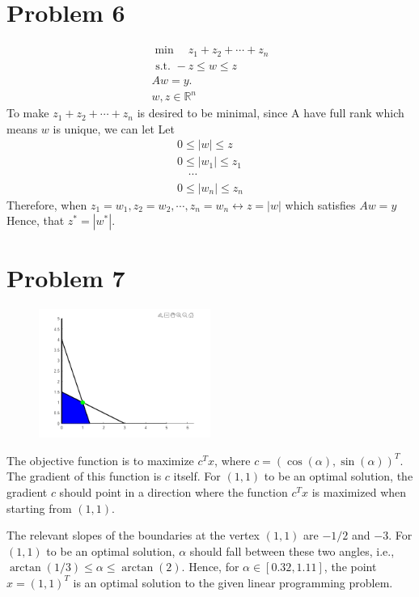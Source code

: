 \documentclass[12pt]{article}
\begin{document}
\section{Problem 6}
$$
\begin{gathered}
\min \quad z_1+z_2+\cdots+z_n \\
\text { s.t. }-z \leq w \leq z \\
A w=y . \\
w, z \in \mathbb{R}^n
\end{gathered}
$$
To make $z_1+z_2+\cdots+z_n$ is desired to be minimal, since A have full rank which means $w$ is unique, we can let 
Let
$$
\begin{gathered}
0 \leq|w| \leq z \\
0 \leq\left|w_1\right| \leq z_1 \\
\quad \cdots \\
0 \leq\left|w_n\right| \leq z_n
\end{gathered}
$$
Therefore, when $z_1=w_1, z_2=w_2, \cdots, z_n=w_n \leftrightarrow z=|w|$ which satisfies $A w=y$
Hence, that $z^*=\left|w^*\right|$.


\clearpage
\section{Problem 7}
\begin{figure}[h]
    \centering
    \includegraphics[width=0.5\textwidth]{fig2.png}
    \label{fig:fig2}
\end{figure}

The objective function is to maximize \(c^T x\), where \(c = (\cos(\alpha), \sin(\alpha))^T\). The gradient of this function is \(c\) itself. For \((1,1)\) to be an optimal solution, the gradient \(c\) should point in a direction where the function \(c^T x\) is maximized when starting from \((1,1)\).

The relevant slopes of the boundaries at the vertex \((1, 1)\) are \(-1/2\) and \(-3\). For \((1,1)\) to be an optimal solution, \(\alpha\) should fall between these two angles, i.e., \(\arctan(1/3) \leq \alpha \leq \arctan(2) \). Hence, for \(\alpha \in [0.32, 1.11]\), the point \(x = (1,1)^T\) is an optimal solution to the given linear programming problem.
\end{document}
